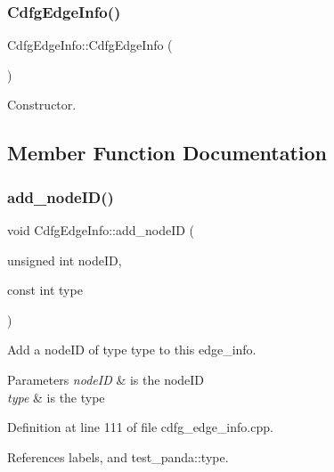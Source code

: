 \subsubsection{\texorpdfstring{Cdfg\+Edge\+Info()}{CdfgEdgeInfo()}}
{\footnotesize\ttfamily Cdfg\+Edge\+Info\+::\+Cdfg\+Edge\+Info (\begin{DoxyParamCaption}{ }\end{DoxyParamCaption})\hspace{0.3cm}{\ttfamily [default]}}



Constructor. 



\subsection{Member Function Documentation}
\mbox{\label{structCdfgEdgeInfo_ae63e9dfd56fde484bee0ac2604e39a3f}} 
\subsubsection{\texorpdfstring{add\+\_\+node\+I\+D()}{add\_nodeID()}}
{\footnotesize\ttfamily void Cdfg\+Edge\+Info\+::add\+\_\+node\+ID (\begin{DoxyParamCaption}\item[{unsigned int}]{node\+ID,  }\item[{const int}]{type }\end{DoxyParamCaption})}



Add a node\+ID of type type to this edge\+\_\+info. 


\begin{DoxyParams}{Parameters}
{\em node\+ID} & is the node\+ID \\
\hline
{\em type} & is the type \\
\hline
\end{DoxyParams}


Definition at line 111 of file cdfg\+\_\+edge\+\_\+info.\+cpp.



References labels, and test\+\_\+panda\+::type.

\mbox{\label{structCdfgEdgeInfo_a6a08ecaafed49f5a28292b7157e0f39e}} 
